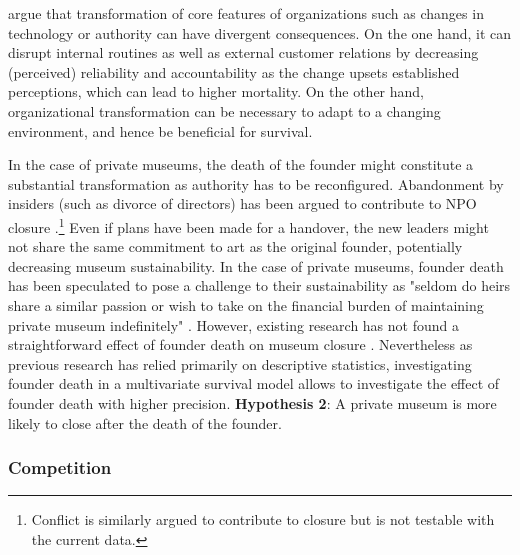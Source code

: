 \documentclass[12pt]{article}
\begin{document}
\textcite{Carroll_Khessina_2019_demography} argue that transformation of core features of organizations such as changes in technology or authority can have divergent consequences. 
On the one hand, it can disrupt internal routines as well as external customer relations by decreasing (perceived) reliability and accountability as the change upsets established perceptions, which can lead to higher mortality. 
On the other hand, organizational transformation can be necessary to adapt to a changing environment, and hence be beneficial for survival.



In the case of private museums, the death of the founder might constitute a substantial transformation as authority has to be reconfigured.
Abandonment by insiders (such as divorce of directors) has been argued to contribute to NPO closure \parencite{Duckles_Hager_Galaskiewicz_2005_close}.\footnote{Conflict is similarly argued to contribute to closure but is not testable with the current data.}
Even if plans have been made for a handover, the new leaders might not share the same commitment to art as the original founder, potentially decreasing museum sustainability. 
In the case of private museums, founder death has been speculated to pose a challenge to their sustainability as "seldom do heirs share a similar passion or wish to take on the financial burden of maintaining private museum indefinitely" \parencite[p.234]{Walker_2019_collector}.
However, existing research has not found a straightforward effect of founder death on museum closure \parencite{Velthuis_Gera_forthcoming_fragility,Velthuis_etal_2023_boom}.
Nevertheless as previous research has relied primarily on descriptive statistics, investigating founder death in a multivariate survival model allows to investigate the effect of founder death with higher precision.
\bigbreak
\noindent
\textbf{Hypothesis 2}: A private museum is more likely to close after the death of the founder.



\subsubsection*{Competition}
\end{document}
